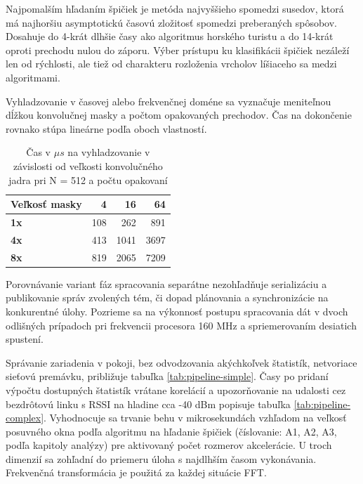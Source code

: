 Najpomalším hľadaním špičiek je metóda najvyššieho spomedzi susedov, ktorá má najhoršiu asymptotickú časovú zložitosť
spomedzi preberaných spôsobov. Dosahuje do 4-krát dlhšie časy ako algoritmus horského turistu a do 14-krát oproti prechodu
nulou do záporu. Výber prístupu ku klasifikácii špičiek nezáleží len od rýchlosti, ale tiež od charakteru rozloženia
vrcholov líšiaceho sa medzi algoritmami.

Vyhladzovanie v časovej alebo frekvenčnej doméne sa vyznačuje meniteľnou dĺžkou konvolučnej masky a počtom opakovaných
prechodov. Čas na dokončenie rovnako stúpa lineárne podľa oboch vlastností.
\begin{table}[h]
\def\arraystretch{1.25}
\centering
\begin{tabular}{|l|r|r|r|}
\hline
\textbf{Veľkosť masky}  & \textbf{4} & \textbf{16} & \textbf{64} \\ \hline
\textbf{1x} & 108        & 262         & 891         \\ \hline
\textbf{4x} & 413        & 1041        & 3697        \\ \hline
\textbf{8x} & 819        & 2065        & 7209        \\ \hline
\end{tabular}
\caption{Čas v $\mu s$ na vyhladzovanie v závislosti od veľkosti konvolučného jadra pri N = 512 a počtu opakovaní}
\label{tab:kernel-execution}
\end{table}

Porovnávanie variant fáz spracovania separátne nezohľadňuje serializáciu a publikovanie správ zvolených tém, či
dopad plánovania a synchronizácie na konkurentné úlohy. Pozrieme sa na výkonnosť postupu spracovania dát v dvoch odlišných prípadoch
pri frekvencii procesora 160 MHz a spriemerovaním desiatich spustení.

Správanie zariadenia v pokoji, bez odvodzovania akýchkoľvek štatistík, netvoriace sieťovú premávku, približuje tabuľka
\ref{tab:pipeline-simple}. Časy po pridaní výpočtu dostupných štatistík vrátane korelácií a upozorňovanie na udalosti
cez bezdrôtovú linku s RSSI na hladine cca -40 dBm popisuje tabuľka \ref{tab:pipeline-complex}. Vyhodnocuje sa trvanie behu
v mikrosekundách vzhľadom na veľkosť posuvného okna podľa algoritmu na hľadanie špičiek (číslovanie: A1, A2, A3, podľa kapitoly analýzy)
pre aktivovaný počet rozmerov akcelerácie. U troch dimenzií sa zohľadní do priemeru úloha s najdlhším časom vykonávania.
Frekvenčná transformácia je použitá za každej situácie FFT.

